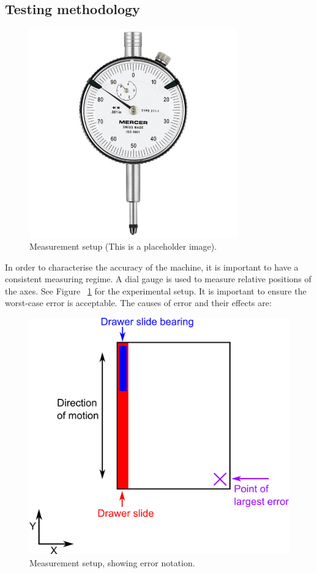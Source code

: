 \subsection{Testing methodology}

\begin{figure}[ht!]
\centering
\includegraphics[width=90mm]{resources/dialgauge.png}
\caption{Measurement setup (This is a placeholder image).}
\label{dialgauge}
\end{figure}

In order to characterise the accuracy of the machine, it is important to have a consistent measuring regime. A dial gauge is used to measure
relative positions of the axes. See Figure ~\ref{dialgauge} for the experimental setup. It is important to ensure the worst-case error is acceptable. The causes of error and their effects are:

\begin{figure}[ht!]
\centering
\includegraphics[width=150mm]{resources/errors.png}
\caption{Measurement setup, showing error notation.}
\label{errornotation}
\end{figure}

